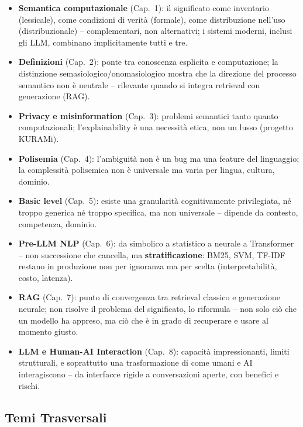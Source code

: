 \documentclass[12pt,a4paper]{article}
\begin{document}
\begin{itemize}
  \item \textbf{Semantica computazionale} (Cap.~1): il significato come inventario (lessicale), come condizioni di verit\`a (formale), come distribuzione nell'uso (distribuzionale) -- complementari, non alternativi; i sistemi moderni, inclusi gli LLM, combinano implicitamente tutti e tre.
  \item \textbf{Definizioni} (Cap.~2): ponte tra conoscenza esplicita e computazione; la distinzione semasiologico/onomasiologico mostra che la direzione del processo semantico non \`e neutrale -- rilevante quando si integra retrieval con generazione (RAG).
  \item \textbf{Privacy e misinformation} (Cap.~3): problemi semantici tanto quanto computazionali; l'explainability \`e una necessit\`a etica, non un lusso (progetto KURAMi).
  \item \textbf{Polisemia} (Cap.~4): l'ambiguit\`a non \`e un bug ma una feature del linguaggio; la complessit\`a polisemica non \`e universale ma varia per lingua, cultura, dominio.
  \item \textbf{Basic level} (Cap.~5): esiste una granularit\`a cognitivamente privilegiata, n\'e troppo generica n\'e troppo specifica, ma non universale -- dipende da contesto, competenza, dominio.
  \item \textbf{Pre-LLM NLP} (Cap.~6): da simbolico a statistico a neurale a Transformer -- non successione che cancella, ma \textbf{stratificazione}: BM25, SVM, TF-IDF restano in produzione non per ignoranza ma per scelta (interpretabilit\`a, costo, latenza).
  \item \textbf{RAG} (Cap.~7): punto di convergenza tra retrieval classico e generazione neurale; non risolve il problema del significato, lo riformula -- non solo ci\`o che un modello ha appreso, ma ci\`o che \`e in grado di recuperare e usare al momento giusto.
  \item \textbf{LLM e Human-AI Interaction} (Cap.~8): capacit\`a impressionanti, limiti strutturali, e soprattutto una trasformazione di come umani e AI interagiscono -- da interfacce rigide a conversazioni aperte, con benefici e rischi.
\end{itemize}

\subsection{Temi Trasversali}
\end{document}
